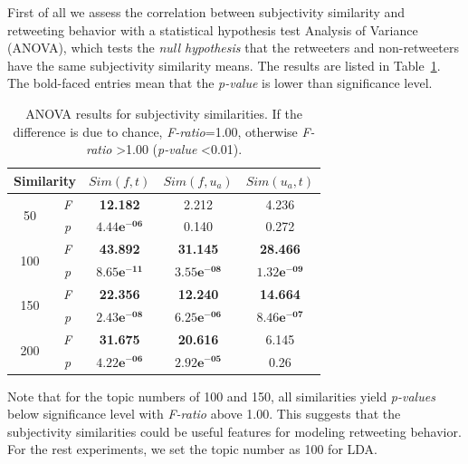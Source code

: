 \documentclass[letterpaper]{article}
\begin{document}
First of all we assess the correlation between subjectivity similarity and retweeting behavior with a statistical hypothesis test Analysis of Variance (ANOVA)\cite{fisher1970statistical}, which tests the \textit{null hypothesis} that the retweeters and non-retweeters have the same subjectivity similarity means. 
The results are listed in Table~\ref{tab2}. The bold-faced entries mean that the \textit{p-value} is lower than significance level.
\begin{table}[htb]
\scriptsize
\centering
\caption{ANOVA results for subjectivity similarities. If the difference is due to chance, \textit{F-ratio}=1.00, otherwise \textit{F-ratio} \textgreater 1.00 (\textit{p-value} \textless 0.01).}
\label{tab2}
\begin{tabular}{|c|c|c|c|c|}
\hline
\multicolumn{2}{|c|}{Similarity}& $ Sim(f,t) $ & $ Sim(f,u_a)  $ & $ Sim(u_a,t)  $\\
\hline
\multirow{2}{*}{50} & \textit{F} & \textbf{12.182} & 2.212 & 4.236 \\
\cline{2-5}
  & \textit{p} &  $\mathbf{4.44e^{-06}}$  & 0.140 & 0.272\\
\hline
\multirow{2}{*}{100} & \textit{F} & \textbf{43.892} & \textbf{31.145} & \textbf{28.466} \\
\cline{2-5}
  & \textit{p} &  $\mathbf{8.65e^{-11}}$  & $\mathbf{3.55e^{-08}}$ & $\mathbf{1.32e^{-09}}$\\
\hline
\multirow{2}{*}{150} & \textit{F} & \textbf{22.356} & \textbf{12.240} & \textbf{14.664} \\
\cline{2-5}
  & \textit{p} &  $\mathbf{2.43e^{-08}}$  & $\mathbf{6.25e^{-06}}$ & $\mathbf{8.46e^{-07}}$\\
\hline
\multirow{2}{*}{200} & \textit{F} & \textbf{31.675} & \textbf{20.616} & 6.145\\
\cline{2-5}
  & \textit{p} &  $\mathbf{4.22e^{-06}}$  & $\mathbf{2.92e^{-05}}$ & 0.26\\
\hline
\end{tabular}
\end{table}
Note that for the topic numbers of 100 and 150, all similarities yield \textit{p-values} below significance level with \textit{F-ratio} above 1.00. This suggests that the subjectivity similarities could be useful features for modeling retweeting behavior. 
For the rest experiments, we set the topic number as 100 for LDA. 
\end{document}

